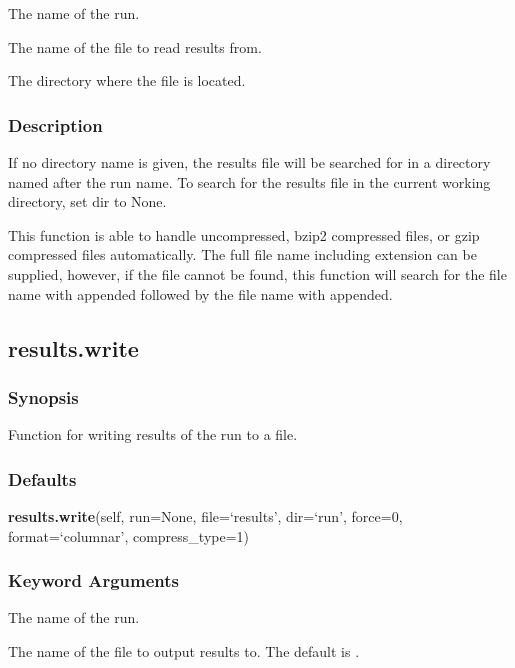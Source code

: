   The name of the run.

  The name of the file to read  results from.

  The directory where the file is located.

\subsubsection{Description}

If no directory name is given, the results file will be searched for in a directory named
after the run name.  To search for the results file in the current working directory, set
dir to None.

This function is able to handle uncompressed,  bzip2  compressed files, or gzip  compressed
files automatically.  The full file name including extension can be supplied, however, if
the file cannot be found, this function will search for the file name with 
 appended
followed by the file name with 
 appended.


\newpage

\subsection{results.write}


\subsubsection{Synopsis}

Function for writing results of the run to a file.

\subsubsection{Defaults}

\textsf{\textbf{results.write}(self, run=None, file=`results', dir=`run', force=0, format=`columnar', compress\_type=1)}


\subsubsection{Keyword Arguments}


  The name of the run.

  The name of the file to output results to.  The default is 
.

